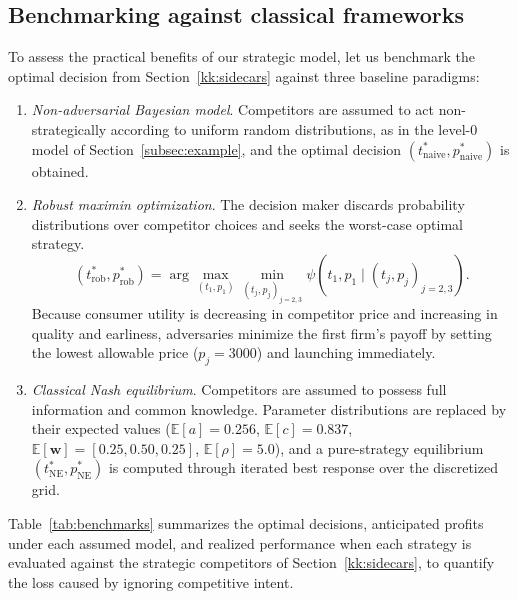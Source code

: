 \documentclass[a4paper,fleqn, 11pt]{cas-sc}
\begin{document}
\subsection{Benchmarking against classical frameworks}\label{sec:benchmarking}

To assess the practical benefits of our strategic model, let us benchmark the optimal decision from Section~\ref{kk:sidecars} against three baseline paradigms:
\begin{enumerate}
    \item \emph{Non-adversarial Bayesian model}. Competitors are assumed to act non-strategically according to uniform random distributions, as in the level-0 model of Section~\ref{subsec:example}, and the optimal decision $(t_{\text{naive}}^*, p_{\text{naive}}^*)$ is obtained. 
    \item \emph{Robust maximin optimization}. The decision maker discards probability distributions over competitor choices and seeks the worst-case optimal strategy.
    \begin{equation}
        (t_{\text{rob}}^*, p_{\text{rob}}^*) = \arg\max_{(t_1, p_1)} \min_{(t_j, p_j)_{j=2,3}} \psi(t_1, p_1 \mid (t_j, p_j)_{j=2,3}).
        \label{eq:minimax}
    \end{equation}
    Because consumer utility is decreasing in competitor price and increasing in quality and earliness, adversaries minimize the first firm's payoff by setting the lowest allowable price ($p_j = 3000$) and launching immediately.
    \item \emph{Classical Nash equilibrium}. Competitors are assumed to possess full information and common knowledge. Parameter distributions are replaced by their expected values ($\mathbb{E}[a]=0.256$, $\mathbb{E}[c]=0.837$, $\mathbb{E}[\bm{w}]=[0.25, 0.50, 0.25]$, $\mathbb{E}[\rho]=5.0$), and a pure-strategy equilibrium $(t_{\text{NE}}^*, p_{\text{NE}}^*)$ is computed through iterated best response over the discretized grid.
\end{enumerate}
%
Table~\ref{tab:benchmarks} summarizes the optimal decisions, anticipated profits under each assumed model, and realized performance when each strategy is evaluated against the strategic competitors of Section~\ref{kk:sidecars}, to quantify the loss caused by ignoring competitive intent. 
\end{document}
